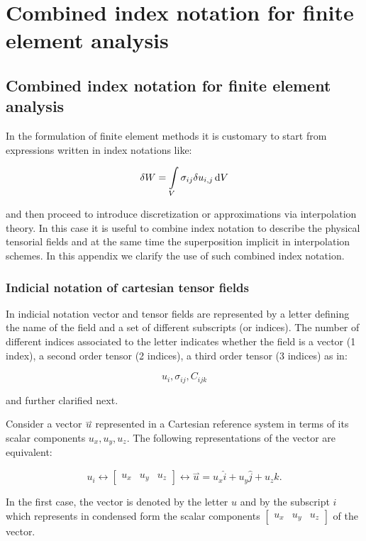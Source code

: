 %
\chapter{Combined index notation for finite element analysis}

\section{Combined index notation for finite element analysis}
In the formulation of finite element methods it is customary to start from expressions written in index notations like:


\[ \delta W = \int\limits_V \sigma_{ij} \delta u_{i,j} \dd{V} \]


and then proceed to introduce discretization or approximations via interpolation theory. In this case it is useful to combine index notation to describe the physical tensorial fields and at the same time the superposition implicit in interpolation schemes. In this appendix we clarify the use of such combined index notation.

\subsection{Indicial notation of cartesian tensor fields}

In indicial notation vector and tensor fields are represented by a letter defining the name of the field and a set of different subscripts (or indices). The number of different indices associated to the letter indicates whether the field is a vector (1 index), a second order tensor (2 indices), a third order tensor (3 indices) as in:

\[u_i , \sigma_{ij} , C_{ijk}\]

and further clarified next.
 
Consider a vector $\overset\rightharpoonup u$ represented in a Cartesian reference system in terms of its scalar components $u_x , u_y , u_z$. The following representations of the vector are equivalent:

\[u_i\leftrightarrow\begin{bmatrix}u_x&u_y&u_z\end{bmatrix}\leftrightarrow\overset\rightharpoonup u=u_x\widehat i+u_y\widehat j+u_z\widehat k.\]

In the first case, the vector is denoted by the letter $u$ and by the subscript $i$ which represents in condensed form the scalar components $\begin{bmatrix}u_x&u_y&u_z\end{bmatrix}$ of the vector.

